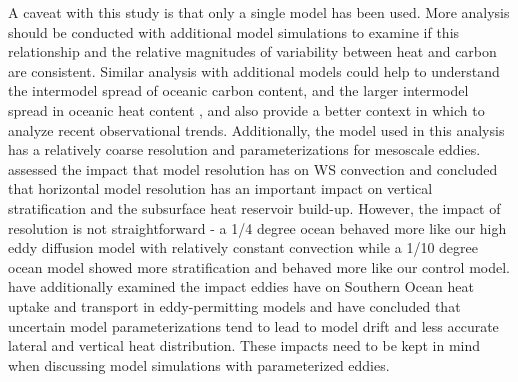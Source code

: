 A caveat with this study is that only a single model has been used. More
analysis should be conducted with additional model simulations to examine if
this relationship and the relative magnitudes of variability between heat and
carbon are consistent. Similar analysis with additional models could help to
understand the
intermodel spread of oceanic carbon content, and the larger intermodel spread
in  oceanic heat content \citep{Frolicher2014}, and also provide a better context
in which to analyze recent observational trends. Additionally, the model used in
this analysis has a relatively coarse resolution and parameterizations for
mesoscale eddies. \citet{Dufour2017} assessed the impact that model resolution has on
WS convection and concluded that horizontal model resolution has
an important impact on vertical stratification and the subsurface heat reservoir build-up.
However, the impact of resolution is not straightforward - a 1/4 degree ocean
behaved more like our high eddy diffusion model with relatively constant convection
while a 1/10 degree ocean model showed more stratification and behaved more
like our control model.
\citet{GRIFFIES2015} have additionally examined the impact eddies have on Southern
Ocean heat uptake and transport in eddy-permitting models
and have concluded that uncertain model
parameterizations tend to lead to model drift and less accurate lateral and
vertical heat distribution. These impacts need to be kept in mind when discussing
model simulations with parameterized eddies.



%
